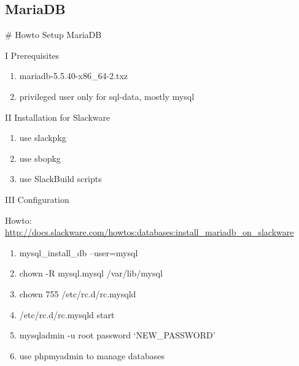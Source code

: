 \documentclass[letterpaper,10pt,english]{sphinxmanual}
\begin{document}
\subsection{MariaDB}
\label{sdocs/databases/mariadb/mariadb:mariadb}\label{sdocs/databases/mariadb/mariadb::doc}
\# Howto Setup MariaDB

I Prerequisites
\begin{enumerate}
\item {} 
mariadb-5.5.40-x86\_64-2.txz

\item {} 
privileged user only for sql-data, mostly mysql

\end{enumerate}

II Installation for Slackware
\begin{enumerate}
\item {} 
use slackpkg

\item {} 
use sbopkg

\item {} 
use SlackBuild scripts

\end{enumerate}

III Configuration

Howto: \href{http://docs.slackware.com/howtos:databases:install\_mariadb\_on\_slackware}{http://docs.slackware.com/howtos:databases:install\_mariadb\_on\_slackware}
\begin{enumerate}
\item {} 
mysql\_install\_db --user=mysql

\item {} 
chown -R mysql.mysql /var/lib/mysql

\item {} 
chown 755 /etc/rc.d/rc.mysqld

\item {} 
/etc/rc.d/rc.mysqld start

\item {} 
mysqladmin -u root password `NEW\_PASSWORD'

\item {} 
use phpmyadmin to manage databases

\end{enumerate}
\end{document}
